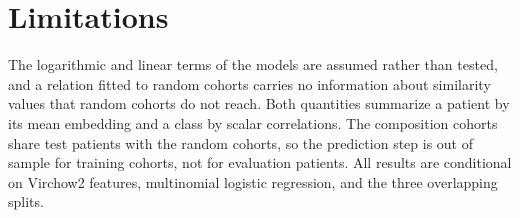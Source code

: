 \documentclass[11pt]{article}
\begin{document}


\section{Limitations}
\label{sec:limitations}
The logarithmic and linear terms of the models are assumed rather than tested, and a relation fitted to random cohorts carries no information about similarity values that random cohorts do not reach. Both quantities summarize a patient by its mean embedding and a class by scalar correlations. The composition cohorts share test patients with the random cohorts, so the prediction step is out of sample for training cohorts, not for evaluation patients. All results are conditional on Virchow2 features, multinomial logistic regression, and the three overlapping splits.



\end{document}

